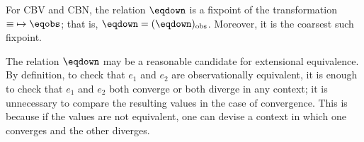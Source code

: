 \begin{theorem}
\label{thm:obs}
For CBV and CBN, the relation $\eqdown$ is a fixpoint of the transformation ${\equiv}\mapsto{\eqobs}$;
that is, ${\eqdown}=({\eqdown)_{\mathrm{obs}}}$. Moreover, it is the coarsest such fixpoint.
\end{theorem}
The relation $\eqdown$ may be a reasonable candidate for extensional equivalence. 
By definition, to check that $e_1$ and $e_2$ are observationally equivalent, it is enough to check that $e_1$ and $e_2$ both converge or both diverge in any context; it is unnecessary to compare the resulting values in the case of convergence. This is because if the values are not equivalent, one can devise a context in which one converges and the other diverges.

